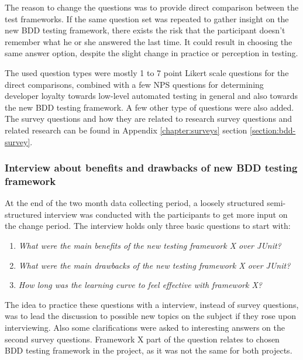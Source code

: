     The reason to change the questions was to provide direct comparison between the test frameworks.
    If the same question set was repeated to gather insight on the new BDD testing framework, there exists the risk that
    the participant doesn't remember what he or she answered the last time. It could result in choosing the same answer option,
    despite the slight change in practice or perception in testing.

    The used question types were mostly 1 to 7 point Likert scale questions for the direct comparisons, combined with a few NPS questions for
    determining developer loyalty towards low-level automated testing in general and also towards the new BDD testing framework.
    A few other type of questions were also added.
    The survey questions and how they are related to research survey questions and related research can be found
    in Appendix \ref{chapter:surveys} section \ref{section:bdd-survey}.

    \subsubsection{Interview about benefits and drawbacks of new BDD testing framework}
    At the end of the two month data collecting period, a loosely structured semi-structured interview was conducted with the participants
    to get more input on the change period. The interview holds only three basic questions to start with:
    \begin{enumerate}
    \item \textit{What were the main benefits of the new testing framework X over JUnit?}
    \item \textit{What were the main drawbacks of the new testing framework X over JUnit?}
    \item \textit{How long was the learning curve to feel effective with framework X?}
    \end{enumerate}
    The idea to practice these questions with a interview, instead of survey questions, was to lead the discussion
    to possible new topics on the subject if they rose upon interviewing. Also some clarifications were asked to interesting
    answers on the second survey questions. Framework X part of the question relates
    to chosen BDD testing framework in the project, as it was not the same for both projects.

